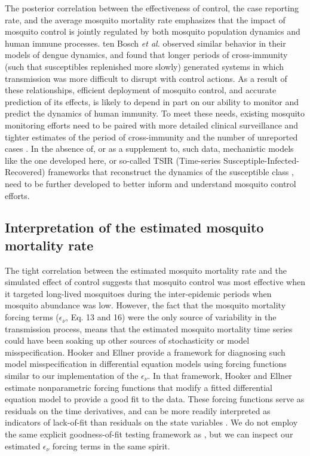\documentclass[10pt,letterpaper]{article}
\begin{document}
The posterior correlation between the effectiveness of control, the case reporting rate, and the average mosquito mortality rate emphasizes that the impact of mosquito control is jointly regulated by both mosquito population dynamics and human immune processes.
ten Bosch \emph{et al.} \cite{TenBosch2016} observed similar behavior in their models of dengue dynamics, and found that longer periods of cross-immunity (such that susceptibles replenished more slowly) generated systems in which transmission was more difficult to disrupt with control actions.
As a result of these relationships, efficient deployment of mosquito control, and accurate prediction of its effects, is likely to depend in part on our ability to monitor and predict the dynamics of human immunity.
To meet these needs, existing mosquito monitoring efforts need to be paired with more detailed clinical surveillance \cite{Morrison2008} and tighter estimates of the period of cross-immunity \cite{TenBosch2016} and the number of unreported cases \cite{Silva2016}.
In the absence of, or as a supplement to, such data, mechanistic models like the one developed here, or so-called TSIR (Time-series Susceptiple-Infected-Recovered) frameworks that reconstruct the dynamics of the susceptible class \cite{Finkenstadt2000, Reich2013}, need to be further developed to better inform and understand mosquito control efforts.

\subsection*{Interpretation of the estimated mosquito mortality rate}

The tight correlation between the estimated mosquito mortality rate and the simulated effect of control suggests that mosquito control was most effective when it targeted long-lived mosquitoes during the inter-epidemic periods when mosquito abundance was low.  
However, the fact that the mosquito mortality forcing terms ($\epsilon_{\nu}$, Eq. 13 and 16) were the only source of variability in the transmission process, means that the estimated mosquito mortality time series could have been soaking up other sources of stochasticity or model misspecification.
Hooker and Ellner \cite{Hooker2015} provide a framework for diagnosing such model misspecification in differential equation models using forcing functions similar to our implementation of the $\epsilon_{\nu}$.
In that framework, Hooker and Ellner \cite{Hooker2015} estimate nonparametric forcing functions that modify a fitted differential equation model to provide a good fit to the data.
These forcing functions serve as residuals on the time derivatives, and can be more readily interpreted as indicators of lack-of-fit than residuals on the state variables \cite{Hotelling1927, Hooker2015}.
We do not employ the same explicit goodness-of-fit testing framework as \cite{Hooker2015}, but we can inspect our estimated $\epsilon_{\nu}$ forcing terms in the same spirit.
\end{document}
